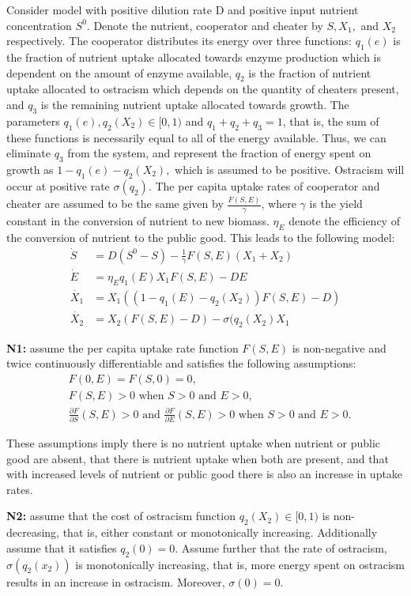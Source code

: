 \documentclass[12pt]{article}
\begin{document}
Consider model with positive dilution rate D and positive input nutrient concentration $S^0$. Denote the nutrient, cooperator and cheater by $S, X_1,$ and $X_2$ respectively. The cooperator distributes its energy over three functions: $q_1(e)$ is the fraction of nutrient uptake allocated towards enzyme production which is dependent on the amount of enzyme available, $q_2$ is the fraction of nutrient uptake allocated to ostracism which depends on the quantity of cheaters present, and $q_3$ is the remaining nutrient uptake allocated towards growth. The parameters $q_1(e), q_2(X_2) \in [0,1)$ and $q_1+q_2+q_3=1$, that is, the sum of these functions is necessarily equal to all of the energy available. Thus, we can eliminate $q_3$ from the system, and represent the fraction of energy spent on growth as $1-q_1(e)-q_2(X_2),$ which is assumed to be positive. Ostracism will occur at positive rate  $\sigma(q_2)$. The per capita uptake rates of cooperator and cheater are assumed to be the same given by $\frac{F(S,E)}{\gamma}$, where $\gamma$ is the yield constant in the conversion of nutrient to new biomass. $\eta_E$ denote the efficiency of the conversion of nutrient to the public good. 
\noindent This leads to the following model: 
\begin{align}
\dot{S}&=D(S^0-S)-\frac{1}{\gamma}F(S,E)(X_1 + X_2)\\
\dot{E}&=\eta_E q_1(E) X_1 F(S,E)-DE\\
\dot{X_1} &= X_1((1-q_1(E)-q_2(X_2))F(S,E)-D)\\
\dot{X_2}&=X_2(F(S,E)-D)- \sigma (q_2 (X_2) X_1
\end{align}

\noindent \textbf{N1:} assume the per capita uptake rate function $F(S,E)$ is non-negative and twice continuously differentiable and satisfies the following assumptions: 
\begin{align*}
&F(0,E)=F(S,0)=0,\\
&F(S,E)>0 \text{ when } S>0 \text{ and } E>0,\\
&\frac{\partial F}{\partial S}(S,E)>0 \text{ and } \frac{\partial F}{\partial E}(S,E)>0 \text { when } S>0 \text{ and } E>0.
\end{align*}

These assumptions imply there is no nutrient uptake when nutrient or public good are absent, that there is nutrient uptake when both are present, and that with increased levels of nutrient or public good there is also an increase in uptake rates. 

\noindent \textbf{N2: }  assume that the cost of ostracism function $q_2(X_2) \in [0,1)$ is non-decreasing, that is, either constant or monotonically increasing. Additionally assume that it satisfies $q_2(0)=0$. Assume further that the rate of ostracism, $\sigma(q_2(x_2))$ is monotonically increasing, that is, more energy spent on ostracism results in an increase in ostracism. Moreover, $\sigma(0)=0$. 
\end{document}
